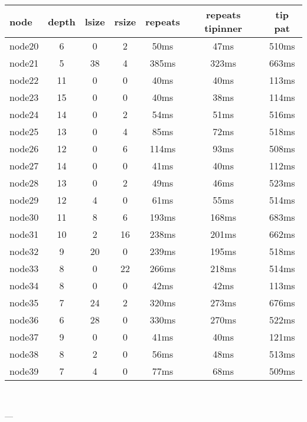 \begin{tabular}{|l|c|c|c|c|c|c|}
\hline node & depth & lsize & rsize  & repeats & repeats tipinner & tip pat\\
    \hline node20 & 6 & 0 & 2 & 50ms & 47ms & 510ms\\
    \hline node21 & 5 & 38 & 4 & 385ms & 323ms & 663ms\\
    \hline node22 & 11 & 0 & 0 & 40ms & 40ms & 113ms\\
    \hline node23 & 15 & 0 & 0 & 40ms & 38ms & 114ms\\
    \hline node24 & 14 & 0 & 2 & 54ms & 51ms & 516ms\\
    \hline node25 & 13 & 0 & 4 & 85ms & 72ms & 518ms\\
    \hline node26 & 12 & 0 & 6 & 114ms & 93ms & 508ms\\
    \hline node27 & 14 & 0 & 0 & 41ms & 40ms & 112ms\\
    \hline node28 & 13 & 0 & 2 & 49ms & 46ms & 523ms\\
    \hline node29 & 12 & 4 & 0 & 61ms & 55ms & 514ms\\
    \hline node30 & 11 & 8 & 6 & 193ms & 168ms & 683ms\\
    \hline node31 & 10 & 2 & 16 & 238ms & 201ms & 662ms\\
    \hline node32 & 9 & 20 & 0 & 239ms & 195ms & 518ms\\
    \hline node33 & 8 & 0 & 22 & 266ms & 218ms & 514ms\\
    \hline node34 & 8 & 0 & 0 & 42ms & 42ms & 113ms\\
    \hline node35 & 7 & 24 & 2 & 320ms & 273ms & 676ms\\
    \hline node36 & 6 & 28 & 0 & 330ms & 270ms & 522ms\\
    \hline node37 & 9 & 0 & 0 & 41ms & 40ms & 121ms\\
    \hline node38 & 8 & 2 & 0 & 56ms & 48ms & 513ms\\
    \hline node39 & 7 & 4 & 0 & 77ms & 68ms & 509ms\\

\hline
\end{tabular} \

---


